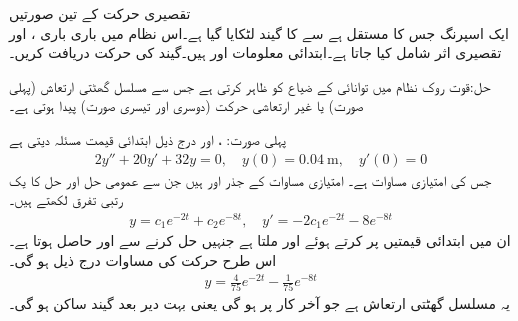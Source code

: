 \quad تقصیری حرکت کے تین صورتیں\\
ایک اسپرنگ جس کا مستقل  ہے سے  کا گیند لٹکایا گیا ہے۔اس نظام میں باری باری ،  اور  تقصیری اثر شامل  کیا جاتا ہے۔ابتدائی معلومات  اور  ہیں۔گیند کی حرکت دریافت کریں۔

حل:قوت روک نظام میں توانائی کے ضیاع کو ظاہر کرتی ہے جس سے مسلسل گھٹتی ارتعاش (پہلی صورت)  یا  غیر ارتعاشی حرکت (دوسری اور تیسری صورت) پیدا ہوتی ہے۔

پہلی صورت: ،  اور   درج ذیل ابتدائی قیمت مسئلہ دیتی ہے
\begin{align*}
2y''+20y'+32y=0, \quad y(0)=\SI{0.04}{\meter}, \quad y'(0)=0
\end{align*}
جس کی امتیازی مساوات  ہے۔ امتیازی مساوات  کے جذر  اور  ہیں جن سے عمومی حل اور حل کا یک رتبی تفرق لکھتے ہیں۔
\begin{align*}
y=c_1 e^{-2t}+c_2e^{-8t}, \quad y'=-2c_1e^{-2t}-8e^{-8t}
\end{align*}
ان میں ابتدائی قیمتیں پر کرتے ہوئے   اور  ملتا ہے جنہیں حل کرنے سے  اور 
 حاصل ہوتا ہے۔اس طرح حرکت کی مساوات درج ذیل ہو گی۔
\begin{align*}
y=\frac{4}{75}e^{-2t}-\frac{1}{75}e^{-8t}
\end{align*}
یہ مسلسل گھٹتی ارتعاش ہے جو آخر کار  پر  ہو گی یعنی بہت دیر بعد گیند ساکن ہو گی۔

